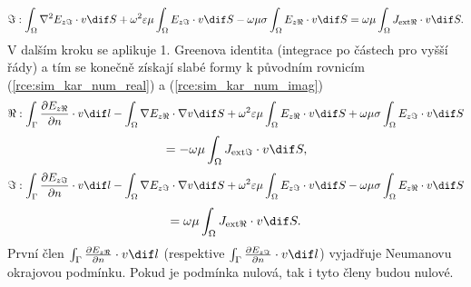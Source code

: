 \begin{equation}
	\Im : \int_{\Omega}\nabla^{2} E_{z\Im}\cdot v\dif S + \omega^{2}\varepsilon\mu\int_{\Omega} E_{z\Im}\cdot v\dif S - \omega\mu\sigma\int_{\Omega} E_{z\Re}\cdot v\dif S = \omega\mu \int_{\Omega}J_{\mathrm{ext}\Re}\cdot v \dif S.
	\label{rce:sim_kar_weak_odv_imag} 
\end{equation}
V dalším kroku se aplikuje 1. Greenova identita \cite[příloha A.2]{num} (integrace po částech pro vyšší řády) a tím se konečně získají slabé formy k původním rovnicím (\ref{rce:sim_kar_num_real}) a (\ref{rce:sim_kar_num_imag})
\begin{displaymath}
\Re : \int_{\Gamma}\frac{\partial E_{z\Re}}{\partial n}\cdot v\dif l-\int_{\Omega}\nabla E_{z\Re}\cdot\nabla v \dif S + \omega^{2}\varepsilon\mu\int_{\Omega} E_{z\Re}\cdot v\dif S  + \omega\mu\sigma\int_{\Omega} E_{z\Im}\cdot v\dif S
\end{displaymath}
\begin{equation}
	 = - \omega\mu \int_{\Omega}J_{\mathrm{ext}\Im}\cdot v \dif S,
	\label{rce:sim_kar_weak_real} 
\end{equation}
\begin{displaymath}
\Im : \int_{\Gamma}\frac{\partial E_{z\Im}}{\partial n}\cdot v\dif l-\int_{\Omega}\nabla E_{z\Im}\cdot\nabla v\dif S + \omega^{2}\varepsilon\mu\int_{\Omega} E_{z\Im}\cdot v\dif S - \omega\mu\sigma\int_{\Omega} E_{z\Re}\cdot v\dif S
\end{displaymath}
\begin{equation}
	= \omega\mu \int_{\Omega}J_{\mathrm{ext}\Re}\cdot v \dif S.
	\label{rce:sim_kar_weak_imag} 
\end{equation}
První člen $\int_{\Gamma}\frac{\partial E_{z\Re}}{\partial n}\cdot v\dif l$ (respektive $\int_{\Gamma}\frac{\partial E_{z\Im}}{\partial n}\cdot v\dif l$) vyjadřuje Neumanovu okrajovou podmínku. Pokud je podmínka nulová, tak i tyto členy budou nulové. 

